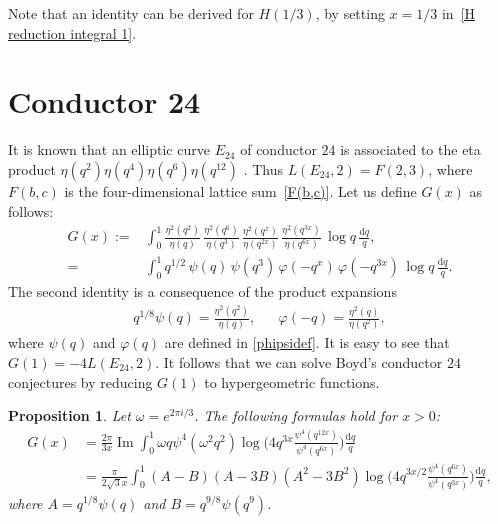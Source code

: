 \documentclass[12pt,reqno]{amsart}
\newtheorem{proposition}{Proposition}
\theoremstyle{remark}
\begin{document}
Note that an identity can be derived for $H(1/3)$, by setting $x=1/3$
in~\eqref{H reduction integral 1}.

\section{Conductor 24}
\label{s-cond24}

It is known that an elliptic curve $E_{24}$ of conductor $24$ is
associated to the eta product $\eta(q^2)\eta(q^4) \eta(q^6) \eta(q^{12})$ \cite{Ono}.
Thus $L(E_{24},2)=F(2,3)$, where $F(b,c)$ is the four-dimensional
lattice sum~\eqref{F(b,c)}.  Let us define $G(x)$ as follows:
\begin{align*}
G(x):=&\int_{0}^{1}\frac{\eta^2(q^2)}{\eta(q)}\,\frac{\eta^2(q^6)}{\eta(q^3)}
\,\frac{\eta^2(q^x)}{\eta(q^{2x})}\,\frac{\eta^2(q^{3x})}{\eta(q^{6x})}\,\log q\,\frac{{{\mathrm d}} q}{q},\\
=&\int_{0}^{1}q^{1/2}\,\psi(q)\,\psi(q^3)\,\varphi(-q^x)\,\varphi(-q^{3x})\,\log q\,\frac{{{\mathrm d}} q}{q}.
\end{align*}
The second identity is a consequence of the product expansions
\begin{align*}
q^{1/8}\psi(q)=\frac{\eta^2(q^2)}{\eta(q)},&&\varphi(-q)=\frac{\eta^2(q)}{\eta(q^2)},
\end{align*}
where $\psi(q)$ and $\varphi(q)$ are defined in \eqref{phipsidef}.
It is easy to see that $G(1)=-4L(E_{24},2)$.  It follows that we
can solve Boyd's conductor $24$ conjectures by reducing $G(1)$ to
hypergeometric functions.

\begin{proposition}
\label{prop3}
Let $\omega=e^{2\pi i/3}$.  The following formulas hold for $x>0$:
\begin{align}\label{G(x) imaginary integral}
G(x)
&=\frac{2\pi}{3x}{\operatorname{Im}}\int_{0}^{1}\omega q\psi^4(\omega^2 q^2)
\log\biggl(4q^{3x}\frac{\psi^4(q^{12x})}{\psi^4(q^{6x})}\biggr)\frac{{{\mathrm d}} q}{q}
\\
\label{G(x) real integral}
&=\frac{\pi}{2\sqrt{3}x}\int_{0}^{1}(A-B)(A-3B)(A^2-3B^2)
\log\biggl(4q^{3x/2}\frac{\psi^4(q^{6x})}{\psi^4(q^{3x})}\biggr)\frac{{{\mathrm d}} q}{q},
\end{align}
where $A=q^{1/8}\psi(q)$ and $B=q^{9/8}\psi(q^{9})$.
\end{proposition}
\end{document}
